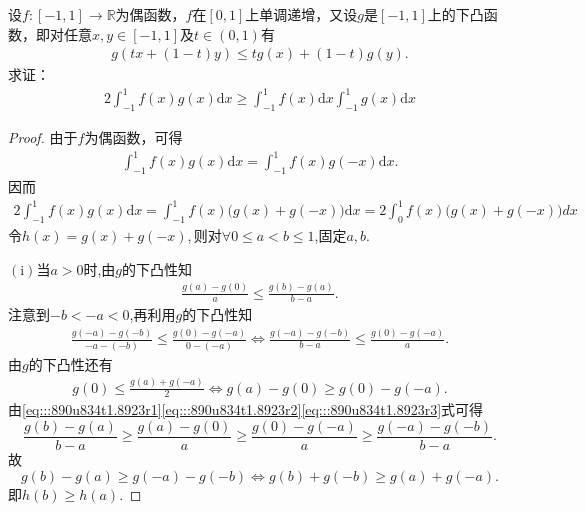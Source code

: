 \documentclass[../../main.tex]{subfiles}
\begin{document}
\begin{example}
设$f:[-1,1]\to\mathbb{R}$为偶函数，$f$在$[0,1]$上单调递增，又设$g$是$[-1,1]$上的下凸函数，即对任意$x,y\in[-1,1]$及$t\in(0,1)$有
\begin{align*}
g(tx+(1-t)y)\leqslant tg(x)+(1-t)g(y).
\end{align*}
求证：
\begin{align*}
2\int_{-1}^1 f(x)g(x)\mathrm{d}x\geqslant \int_{-1}^1 f(x)\mathrm{d}x\int_{-1}^1 g(x)\mathrm{d}x
\end{align*}
\end{example}
\begin{proof}
由于$f$为偶函数，可得
\begin{align*}
\int_{-1}^1 f(x)g(x)\mathrm{d}x = \int_{-1}^1 f(x)g(-x)\mathrm{d}x.
\end{align*}
因而
\begin{align}\label{eq:234r34r345353r4g1}
2\int_{-1}^1 f(x)g(x)\mathrm{d}x = \int_{-1}^1 f(x)\bigl(g(x) + g(-x)\bigr)\mathrm{d}x = 2\int_0^1 f(x)\bigl(g(x) + g(-x)\bigr)dx
\end{align}
令$h(x) = g(x) + g(-x),$则对$\forall 0\leqslant a<b\leqslant 1$,固定$a,b.$

$\left( \mathrm{i} \right)$当$a>0$时,由$g$的下凸性知
\begin{align}\label{eq:::890u834t1.8923r1}
\frac{g\left( a \right) -g\left( 0 \right)}{a}\leqslant \frac{g\left( b \right) -g\left( a \right)}{b-a}.
\end{align}
注意到$-b<-a<0$,再利用$g$的下凸性知
\begin{align}\label{eq:::890u834t1.8923r2}
\frac{g\left( -a \right) -g\left( -b \right)}{-a-\left( -b \right)}\leqslant \frac{g\left( 0 \right) -g\left( -a \right)}{0-\left( -a \right)}\Longleftrightarrow \frac{g\left( -a \right) -g\left( -b \right)}{b-a}\leqslant \frac{g\left( 0 \right) -g\left( -a \right)}{a}.
\end{align}
由$g$的下凸性还有
\begin{align}\label{eq:::890u834t1.8923r3}
g\left( 0 \right) \leqslant \frac{g\left( a \right) +g\left( -a \right)}{2}\Longleftrightarrow g\left( a \right) -g\left( 0 \right) \geqslant g\left( 0 \right) -g\left( -a \right).
\end{align}
由\eqref{eq:::890u834t1.8923r1}\eqref{eq:::890u834t1.8923r2}\eqref{eq:::890u834t1.8923r3}式可得
$$\frac{g\left( b \right) -g\left( a \right)}{b-a}\geqslant \frac{g\left( a \right) -g\left( 0 \right)}{a}\geqslant \frac{g\left( 0 \right) -g\left( -a \right)}{a}\geqslant \frac{g\left( -a \right) -g\left( -b \right)}{b-a}.$$
故
$$g\left( b \right) -g\left( a \right) \geqslant g\left( -a \right) -g\left( -b \right) \Longleftrightarrow g\left( b \right) +g\left( -b \right) \geqslant g\left( a \right) +g\left( -a \right).$$
即$h\left( b \right) \geqslant h\left( a \right)$.


\end{proof}
\end{document}
